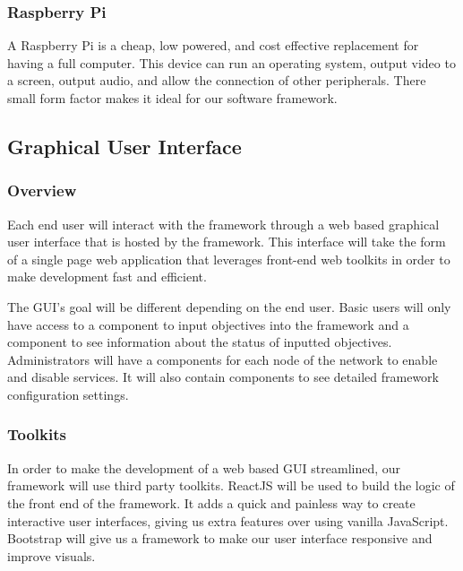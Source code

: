 \documentclass[draftclsnofoot, onecolumn, compsoc, 10pt]{IEEEtran}
\begin{document}
\subsubsection{Raspberry Pi}
A Raspberry Pi is a cheap, low powered, and cost effective replacement for having a full computer. This device can run an operating system, output video to a screen, output audio, and allow the connection of other peripherals. There small form factor makes it ideal for our software framework.




\subsection{Graphical User Interface}
\subsubsection{Overview}
Each end user will interact with the framework through a web based graphical user interface that is hosted by the framework. This interface will take the form of a single page web application that leverages front-end web toolkits in order to make development fast and efficient.

The GUI's goal will be different depending on the end user. Basic users will only have access to a component to input objectives into the framework and a component to see information about the status of inputted objectives. Administrators will have a components for each node of the network to enable and disable services. It will also contain components to see detailed framework configuration settings.


\subsubsection{Toolkits}
In order to make the development of a web based GUI streamlined, our framework will use third party toolkits. ReactJS will be used to build the logic of the front end of the framework. It adds a quick and painless way to create interactive user interfaces, giving us extra features over using vanilla JavaScript. Bootstrap will give us a framework to make our user interface responsive and improve visuals.
\end{document}
